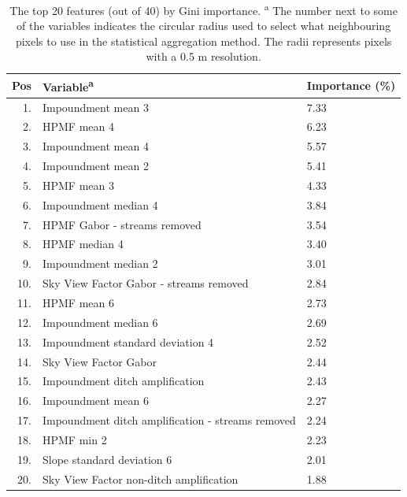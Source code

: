 \documentclass[11pt, review]{elsarticle} %
\begin{document}
\begin{table} [!htb]
\centering
    {\begin{tabular}{r|ll}
      Pos & Variable\textsuperscript{a} & Importance (\%) \\
      \hline
      1.  & Impoundment mean 3                                  & 7.33\\
      2.  & HPMF mean 4                                         & 6.23\\
      3.  & Impoundment mean 4                                  & 5.57\\
      4.  & Impoundment mean 2                                  & 5.41\\
      5.  & HPMF mean 3                                         & 4.33\\
      6.  & Impoundment median 4                                & 3.84\\
      7.  & HPMF Gabor - streams removed                        & 3.54\\
      8.  & HPMF median 4                                       & 3.40\\
      9.  & Impoundment median 2                                & 3.01\\
      10. & Sky View Factor Gabor - streams removed             & 2.84\\
      11. & HPMF mean 6                                         & 2.73\\
      12. & Impoundment median 6                                & 2.69\\
      13. & Impoundment standard deviation 4                    & 2.52\\
      14. & Sky View Factor Gabor                               & 2.44\\
      15. & Impoundment ditch amplification                     & 2.43\\
      16. & Impoundment mean 6                                  & 2.27\\
      17. & Impoundment ditch amplification - streams removed   & 2.24\\
      18. & HPMF min 2                                          & 2.23\\
      19. & Slope standard deviation 6                          & 2.01\\
      20. & Sky View Factor non-ditch amplification             & 1.88\\
      \hline
    \end{tabular}}
    \caption{The top 20 features (out of 40) by Gini importance. \newline \textsuperscript{a} The number next to some of the variables indicates the circular radius used to select what neighbouring pixels to use in the statistical aggregation method. The radii represents pixels with a 0.5 m resolution.}
    \label{featureimportancetable}
\end{table}
\end{document}
